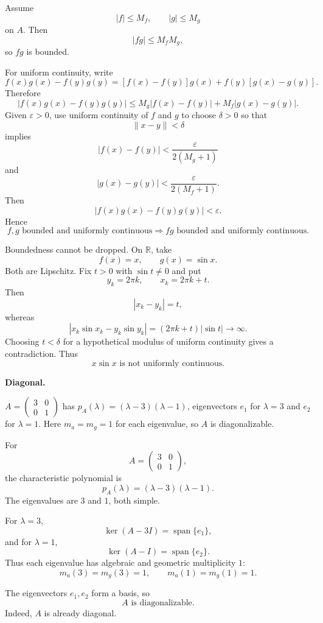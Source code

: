 \begin{solution}
Assume
\[
|f|\le M_f,
\qquad
|g|\le M_g
\]
on \(A\). Then
\[
|fg|\le M_fM_g,
\]
so \(fg\) is bounded.

For uniform continuity, write
\[
f(x)g(x)-f(y)g(y)
=
[f(x)-f(y)]g(x)
+
f(y)[g(x)-g(y)].
\]
Therefore
\[
|f(x)g(x)-f(y)g(y)|
\le
M_g|f(x)-f(y)|
+
M_f|g(x)-g(y)|.
\]
Given \(\varepsilon>0\), use uniform continuity of \(f\) and \(g\) to choose \(\delta>0\)
so that
\[
\|x-y\|<\delta
\]
implies
\[
|f(x)-f(y)|
<
\frac{\varepsilon}{2(M_g+1)}
\]
and
\[
|g(x)-g(y)|
<
\frac{\varepsilon}{2(M_f+1)}.
\]
Then
\[
|f(x)g(x)-f(y)g(y)|<\varepsilon.
\]
Hence
\[
\boxed{
f,g\text{ bounded and uniformly continuous}
\Longrightarrow
fg\text{ bounded and uniformly continuous}.
}
\]

Boundedness cannot be dropped. On \(\mathbb R\), take
\[
f(x)=x,
\qquad
g(x)=\sin x.
\]
Both are Lipschitz. Fix \(t>0\) with \(\sin t\neq0\) and put
\[
y_k=2\pi k,
\qquad
x_k=2\pi k+t.
\]
Then
\[
|x_k-y_k|=t,
\]
whereas
\[
|x_k\sin x_k-y_k\sin y_k|
=
(2\pi k+t)|\sin t|
\to\infty.
\]
Choosing \(t<\delta\) for a hypothetical modulus of uniform continuity gives a contradiction.
Thus
\[
\boxed{x\sin x\text{ is not uniformly continuous}.}
\]
\end{solution}


\begin{problem}[CP-II-0233]
\label{prob:cp-ii-0233}
\textbf{Diagonal.}

\hspace*{1.5em}$A=\begin{pmatrix}3&0\\0&1\end{pmatrix}$ has $p_A(\lambda)=(\lambda-3)(\lambda-1)$, eigenvectors $e_1$ for $\lambda=3$ and $e_2$ for $\lambda=1$. Here $m_a=m_g=1$ for each eigenvalue, so $A$ is diagonalizable.
\end{problem}

\begin{solution}
For
\[
A=
\begin{pmatrix}
3&0\\
0&1
\end{pmatrix},
\]
the characteristic polynomial is
\[
p_A(\lambda)
=
(\lambda-3)(\lambda-1).
\]
The eigenvalues are \(3\) and \(1\), both simple.

For \(\lambda=3\),
\[
\ker(A-3I)
=
\operatorname{span}\{e_1\},
\]
and for \(\lambda=1\),
\[
\ker(A-I)
=
\operatorname{span}\{e_2\}.
\]
Thus each eigenvalue has algebraic and geometric multiplicity \(1\):
\[
m_a(3)=m_g(3)=1,
\qquad
m_a(1)=m_g(1)=1.
\]

The eigenvectors \(e_1,e_2\) form a basis, so
\[
\boxed{A\text{ is diagonalizable}.}
\]
Indeed, \(A\) is already diagonal.
\end{solution}



